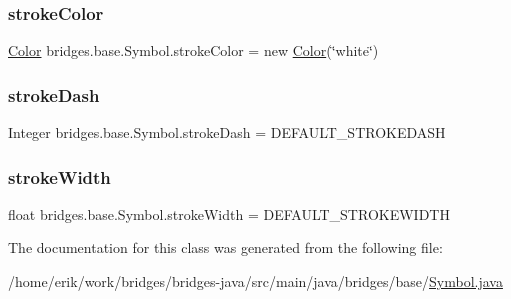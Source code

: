 \subsubsection{\texorpdfstring{stroke\+Color}{strokeColor}}
{\footnotesize\ttfamily \hyperlink{classbridges_1_1base_1_1_color}{Color} bridges.\+base.\+Symbol.\+stroke\+Color = new \hyperlink{classbridges_1_1base_1_1_color}{Color}(\char`\"{}white\char`\"{})\hspace{0.3cm}{\ttfamily [protected]}}

\mbox{\label{classbridges_1_1base_1_1_symbol_a04134e835474c4747e334389f00513c0}} 
\subsubsection{\texorpdfstring{stroke\+Dash}{strokeDash}}
{\footnotesize\ttfamily Integer bridges.\+base.\+Symbol.\+stroke\+Dash = D\+E\+F\+A\+U\+L\+T\+\_\+\+S\+T\+R\+O\+K\+E\+D\+A\+SH\hspace{0.3cm}{\ttfamily [protected]}}

\mbox{\label{classbridges_1_1base_1_1_symbol_af00affe40d45a600e3b8c79fce6c9505}} 
\subsubsection{\texorpdfstring{stroke\+Width}{strokeWidth}}
{\footnotesize\ttfamily float bridges.\+base.\+Symbol.\+stroke\+Width = D\+E\+F\+A\+U\+L\+T\+\_\+\+S\+T\+R\+O\+K\+E\+W\+I\+D\+TH\hspace{0.3cm}{\ttfamily [protected]}}



The documentation for this class was generated from the following file\+:\begin{DoxyCompactItemize}
\item 
/home/erik/work/bridges/bridges-\/java/src/main/java/bridges/base/\hyperlink{_symbol_8java}{Symbol.\+java}\end{DoxyCompactItemize}
